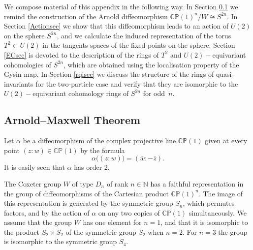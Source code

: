 \documentclass[11pt]{amsart}
\theoremstyle{definition}
\theoremstyle{remark}
\numberwithin{equation}{section}
\def\N{\mathbb{N}}
\newcommand{\CP}{\mathbb{CP}}
\begin{document}
We compose material of this appendix in the following way. In Section \ref{AMT} we remind the construction of the Arnold diffeomorphism $\CP(1)^n/W \cong S^{2n}$. In Section \ref{Actionsec} we show that this diffeomorphism leads to an action of $U(2)$ on the sphere $S^{2n}$, and we calculate the induced representation of the torus $T^2 \subset U(2)$ in the tangents spaces of the fixed points on the sphere. Section \ref{ECsec} is devoted to the description of the rings of $T^2$ and $U(2)-$equivariant cohomologies of $S^{2n}$, which are obtained using the 
localisation property of the Gysin map. 
In Section \ref{rqisec} we discuss the structure of the rings of quasi-invariants for the two-particle case and verify that they are isomorphic to the $U(2)-$equivariant cohomology rings of $S^{2n}$ for odd~$n$. 

\subsection{Arnold--Maxwell Theorem}
\label{AMT}

Let $\alpha$ be a diffeomorphism of the complex projective line $\CP(1)$ given at every point $(z:w)\in \CP(1)$ by the formula 
\[
\alpha \big( (z : w) \big) = (\bar{w} : -\bar{z}).
\]
It is easily seen that $\alpha$ has order 2.

The Coxeter group $W$ of type $D_n$ of rank $n \in \N$ has a faithful representation in the group of diffeomorphisms of the Cartesian product $\CP(1)^n$. %
The image of this representation is generated by the symmetric group $S_n$, which permutes factors, and by the action of $\alpha$ on any two copies of $\CP(1)$ simultaneously. We assume that the group $W$ has one element for $n=1$, and that it is isomorphic to the product $S_2 \times S_2$ of the symmetric group $S_2$ when $n=2$. For $n=3$ the group is isomorphic to the symmetric group $S_4$. 
\end{document}
